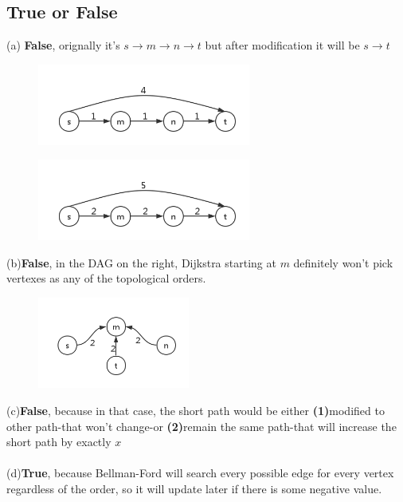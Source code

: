 \documentclass[a4paper]{article}
\begin{document}
\begin{spacing}{1.3}
\section*{True or False}
(a) \textbf{False}, orignally it's $s\rightarrow m\rightarrow n\rightarrow t$ but after modification it will be $s\rightarrow t$
\begin{multicols}{2}
\begin{figure}[H]
    \centering
    \includegraphics[width=7cm]{c1.png}
\end{figure}
\begin{figure}[H]
    \centering
    \includegraphics[width=7cm]{c1-2.png}
\end{figure}
\end{multicols}

\begin{multicols}{2}
\noindent(b)\textbf{False}, in the DAG on the right, Dijkstra starting at $m$ definitely won't pick vertexes as any of the topological orders.
\begin{figure}[H]
    \centering
    \includegraphics[width=5cm]{c2.png}
\end{figure}
\end{multicols}

\noindent(c)\textbf{False}, because in that case, the short path would be either \textbf{(1)}modified to other path-that won't change-or \textbf{(2)}remain the same path-that will increase the short path by exactly $x$
\\\\\noindent(d)\textbf{True}, because Bellman-Ford will search every possible edge for every vertex regardless of the order, so it will update later if there is some negative value.



\end{spacing}
\end{document}
